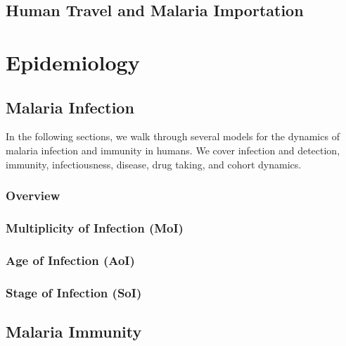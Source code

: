 \documentclass[
]{book}
\begin{document}
\hypertarget{human-travel-and-malaria-importation}{%
\chapter{Human Travel and Malaria Importation}\label{human-travel-and-malaria-importation}}

\hypertarget{part-epidemiology}{%
\part{Epidemiology}\label{part-epidemiology}}

\hypertarget{malaria-infection}{%
\chapter{Malaria Infection}\label{malaria-infection}}

In the following sections, we walk through several models for the dynamics of malaria infection and immunity in humans. We cover infection and detection, immunity, infectiousness, disease, drug taking, and cohort dynamics.

\hypertarget{overview-1}{%
\section{Overview}\label{overview-1}}

\hypertarget{multiplicity-of-infection-moi}{%
\section{Multiplicity of Infection (MoI)}\label{multiplicity-of-infection-moi}}

\hypertarget{age-of-infection-aoi}{%
\section{Age of Infection (AoI)}\label{age-of-infection-aoi}}

\hypertarget{stage-of-infection-soi}{%
\section{Stage of Infection (SoI)}\label{stage-of-infection-soi}}

\hypertarget{malaria-immunity}{%
\chapter{Malaria Immunity}\label{malaria-immunity}}
\end{document}
